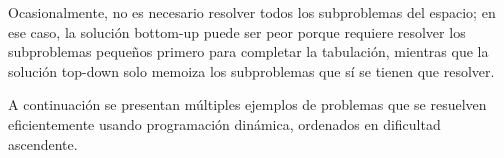 Ocasionalmente, no es necesario resolver todos los subproblemas del espacio; en ese caso, la solución bottom-up puede ser peor porque requiere resolver los subproblemas pequeños primero para completar la tabulación, mientras que la solución top-down solo memoiza los subproblemas que sí se tienen que resolver.

A continuación se presentan múltiples ejemplos de problemas que se resuelven eficientemente usando programación dinámica, ordenados en dificultad ascendente.

